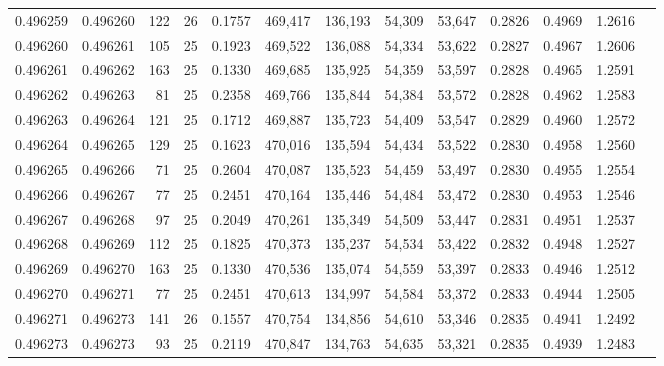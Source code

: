 \begin{tabular}{rrrrrrrrrrrrr}
0.496259 & 0.496260 &   122 &  26 &                                     0.1757 & 469,417 & 136,193 &  54,309 &  53,647 & 0.2826 & 0.4969 & 1.2616 \\
0.496260 & 0.496261 &   105 &  25 &                                     0.1923 & 469,522 & 136,088 &  54,334 &  53,622 & 0.2827 & 0.4967 & 1.2606 \\
0.496261 & 0.496262 &   163 &  25 &                                     0.1330 & 469,685 & 135,925 &  54,359 &  53,597 & 0.2828 & 0.4965 & 1.2591 \\
0.496262 & 0.496263 &    81 &  25 &                                     0.2358 & 469,766 & 135,844 &  54,384 &  53,572 & 0.2828 & 0.4962 & 1.2583 \\
0.496263 & 0.496264 &   121 &  25 &                                     0.1712 & 469,887 & 135,723 &  54,409 &  53,547 & 0.2829 & 0.4960 & 1.2572 \\
0.496264 & 0.496265 &   129 &  25 &                                     0.1623 & 470,016 & 135,594 &  54,434 &  53,522 & 0.2830 & 0.4958 & 1.2560 \\
0.496265 & 0.496266 &    71 &  25 &                                     0.2604 & 470,087 & 135,523 &  54,459 &  53,497 & 0.2830 & 0.4955 & 1.2554 \\
0.496266 & 0.496267 &    77 &  25 &                                     0.2451 & 470,164 & 135,446 &  54,484 &  53,472 & 0.2830 & 0.4953 & 1.2546 \\
0.496267 & 0.496268 &    97 &  25 &                                     0.2049 & 470,261 & 135,349 &  54,509 &  53,447 & 0.2831 & 0.4951 & 1.2537 \\
0.496268 & 0.496269 &   112 &  25 &                                     0.1825 & 470,373 & 135,237 &  54,534 &  53,422 & 0.2832 & 0.4948 & 1.2527 \\
0.496269 & 0.496270 &   163 &  25 &                                     0.1330 & 470,536 & 135,074 &  54,559 &  53,397 & 0.2833 & 0.4946 & 1.2512 \\
0.496270 & 0.496271 &    77 &  25 &                                     0.2451 & 470,613 & 134,997 &  54,584 &  53,372 & 0.2833 & 0.4944 & 1.2505 \\
0.496271 & 0.496273 &   141 &  26 &                                     0.1557 & 470,754 & 134,856 &  54,610 &  53,346 & 0.2835 & 0.4941 & 1.2492 \\
0.496273 & 0.496273 &    93 &  25 &                                     0.2119 & 470,847 & 134,763 &  54,635 &  53,321 & 0.2835 & 0.4939 & 1.2483 \\

\end{tabular}
